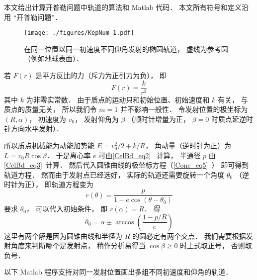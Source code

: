 
\begin{issues}
\end{issues}


本文给出计算开普勒问题中轨道的算法和 Matlab 代码． 本文所有符号和定义沿用 “开普勒问题”．
\begin{figure}[ht]
\centering
\texttt{[image: ./figures/KepNum\_1.pdf]}
\caption{在同一位置以同一初速度不同仰角发射的椭圆轨道， 虚线为参考圆（例如地球表面）．} \label{KepNum_fig1}
\end{figure}

若 $F(r)$ 是平方反比的力（斥力为正引力为负）， 即
\begin{equation}
F(r) = \frac{k}{r^2}
\end{equation}
其中 $k$ 为非零实常数． 由于质点的运动只和初始位置、初始速度和 $k$ 有关， 与质点的质量无关， 所以我们令 $m=1$ 并不影响一般性． 令发射位置的极坐标为 $(R,\alpha)$， 初速度为 $v_0$， 发射仰角为 $\beta$ （顺时针增量为正， $\beta=0$ 时质点延逆时针方向水平发射）．

所以质点机械能为动能加势能 $E = v_0^2/2 + k/R$， 角动量（逆时针为正）为 $L = v_0 R\cos\beta$． 于是离心率 $e$ 可由\autoref{CelBd_eq2}~ 计算， 半通径 $p$ 由\autoref{CelBd_eq3}~计算． 然后代入圆锥曲线的极坐标方程（\autoref{Cone_eq5}~） 即可得到轨道方程． 然而由于发射点已经选好， 实际的轨道还需要旋转一个角度 $\theta_0$ （逆时针为正）， 即轨道方程变为
\begin{equation}
r(\theta)  = \frac{p}{1 - e\cos (\theta-\theta_0)}
\end{equation}
要求 $\theta_0$， 可以代入初始条件， 即 $r(\alpha) = R$． 得
\begin{equation}
\theta_0 = \alpha \pm \arccos(\frac{1-p/R}{e})
\end{equation}
这里有两个解是因为圆锥曲线和半径为 $R$ 的圆必定有两个交点． 我们需要根据发射角度来判断哪个是发射点， 稍作分析易得当 $\cos\beta \geqslant 0$ 时上式取正号， 否则取负号．

以下 Matlab 程序支持对同一发射位置画出多组不同初速度和仰角的轨道．

